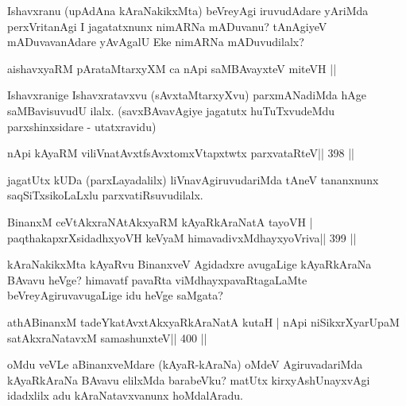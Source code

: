 \begin{artha}
Ishavxranu (upAdAna kAraNakikxMta) beVreyAgi iruvudAdare yAriMda perxVritanAgi I jagatatxnunx nimARNa mADuvanu? tAnAgiyeV mADuvavanAdare yAvAgalU Eke nimARNa mADuvudilalx?
\end{artha}


\begin{shl}
aishavxyaRM pArataMtarxyXM ca nApi saMBAvayxteV miteVH ||
\end{shl}

\begin{artha}
Ishavxranige Ishavxratavxvu (sAvxtaMtarxyXvu) parxmANadiMda hAge saMBavisuvudU ilalx. (savxBAvavAgiye jagatutx huTuTxvudeMdu parxshinxsidare - utatxravidu)
\end{artha}

\begin{shl}
nApi kAyaRM viliVnatAvxtfsAvxtomxVtapxtwtx parxvataRteV\hfill || 398 ||
\end{shl}

\begin{artha}
jagatUtx kUDa (parxLayadalilx) liVnavAgiruvudariMda tAneV tananxnunx saqSiTxsikoLaLxlu parxvatiRsuvudilalx.
\end{artha}


\begin{shl}
BinanxM ceVtAkxraNAtAkxyaRM kAyaRkAraNatA tayoVH |
paqthakapxrXsidadhxyoVH keVyaM himavadivxMdhayxyoVriva|| 399 ||
\end{shl}

\begin{artha}
kAraNakikxMta kAyaRvu BinanxveV Agidadxre avugaLige kAyaRkAraNa BAvavu heVge? himavatf pavaRta viMdhayxpavaRtagaLaMte beVreyAgiruvavugaLige idu heVge saMgata?
\end{artha}


\begin{shl}
athABinanxM tadeYkatAvxtAkxyaRkAraNatA kutaH |
nApi niSikxrXyarUpaM satAkxraNatavxM samashunxteV\hfill || 400 ||
\end{shl}

\begin{artha}
oMdu veVLe aBinanxveMdare (kAyaR-kAraNa) oMdeV AgiruvadariMda kAyaRkAraNa BAvavu elilxMda barabeVku? matUtx kirxyAshUnayxvAgi idadxlilx adu kAraNatavxvanunx hoMdalAradu.
\end{artha}

